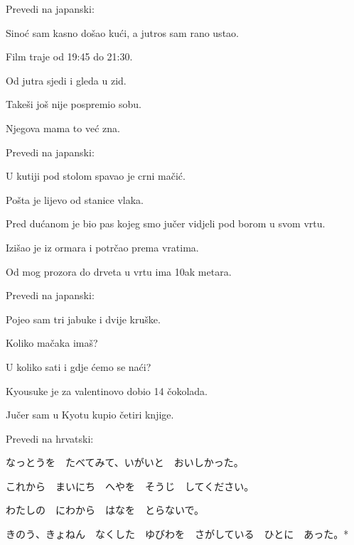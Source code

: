 


\author{Tomislav Mamić}


	
	
	\begin{mondai}{Prevedi na japanski:}
		\item Sinoć sam kasno došao kući, a jutros sam rano ustao.
		\item Film traje od 19:45 do 21:30.
		\item Od jutra sjedi i gleda u zid.
		\item Takeši još nije pospremio sobu.
		\item Njegova mama to već zna.
	\end{mondai}

	
	\begin{mondai}{Prevedi na japanski:}
		\item U kutiji pod stolom spavao je crni mačić.
		\item Pošta je lijevo od stanice vlaka.
		\item Pred dućanom je bio pas kojeg smo jučer vidjeli pod borom u svom vrtu.
		\item Izišao je iz ormara i potrčao prema vratima.
		\item Od mog prozora do drveta u vrtu ima 10ak metara.
	\end{mondai}

	
	\begin{mondai}{Prevedi na japanski:}
		\item Pojeo sam tri jabuke i dvije kruške.
		\item Koliko mačaka imaš?
		\item U koliko sati i gdje ćemo se naći?
		\item Kyousuke je za valentinovo dobio 14 čokolada.
		\item Jučer sam u Kyotu kupio četiri knjige.
	\end{mondai}

	
	\begin{mondai}{Prevedi na hrvatski:}
		\item なっとうを　たべてみて、いがいと　おいしかった。
		\item これから　まいにち　へやを　そうじ　してください。
		\item わたしの　にわから　はなを　とらないで。
		\item きのう、きょねん　なくした　ゆびわを　さがしている　ひとに　あった。*
	\end{mondai}
